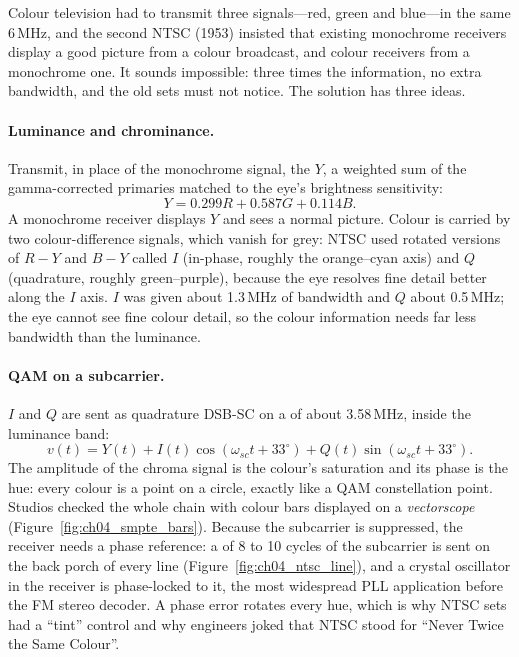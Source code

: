 Colour television had to transmit three signals---red, green and blue---in the same 6\,MHz, and the second
NTSC (1953) insisted that existing monochrome receivers display a good picture from a colour broadcast, and
colour receivers from a monochrome one. It sounds impossible: three times the information, no extra
bandwidth, and the old sets must not notice. The solution has three ideas.

\paragraph{Luminance and chrominance.} Transmit, in place of the monochrome signal, the  $Y$, a
weighted sum of the gamma-corrected primaries matched to the eye's brightness sensitivity:
\begin{equation}
Y=0.299R+0.587G+0.114B.
\label{eq:ch04:luma}
\end{equation}
A monochrome receiver displays $Y$ and sees a normal picture. Colour is carried by two colour-difference
signals, which vanish for grey: NTSC used rotated versions of $R-Y$ and $B-Y$ called $I$ (in-phase, roughly
the orange--cyan axis) and $Q$ (quadrature, roughly green--purple), because the eye resolves fine detail better
along the $I$ axis. $I$ was given about 1.3\,MHz of bandwidth and $Q$ about 0.5\,MHz; the eye cannot see fine
colour detail, so the colour information needs far less bandwidth than the luminance.

\paragraph{QAM on a subcarrier.} $I$ and $Q$ are sent as quadrature DSB-SC on a  of
about 3.58\,MHz, inside the luminance band:
\begin{equation}
v(t)=Y(t)+I(t)\cos(\omega_{sc}t+33^\circ)+Q(t)\sin(\omega_{sc}t+33^\circ).
\end{equation}
The amplitude of the chroma signal is the colour's saturation and its phase is the hue: every colour is a
point on a circle, exactly like a QAM constellation point. Studios checked the whole chain with colour bars
displayed on a \emph{vectorscope} (Figure~\ref{fig:ch04_smpte_bars}). Because the subcarrier is suppressed, the receiver
needs a phase reference: a  of 8 to 10 cycles of the subcarrier is sent on the back porch of
every line (Figure~\ref{fig:ch04_ntsc_line}), and a crystal oscillator in the receiver is phase-locked to it,
the most widespread PLL application before the FM stereo decoder. A phase error rotates every hue, which is
why NTSC sets had a ``tint'' control and why engineers joked that NTSC stood for ``Never Twice the Same
Colour''.

